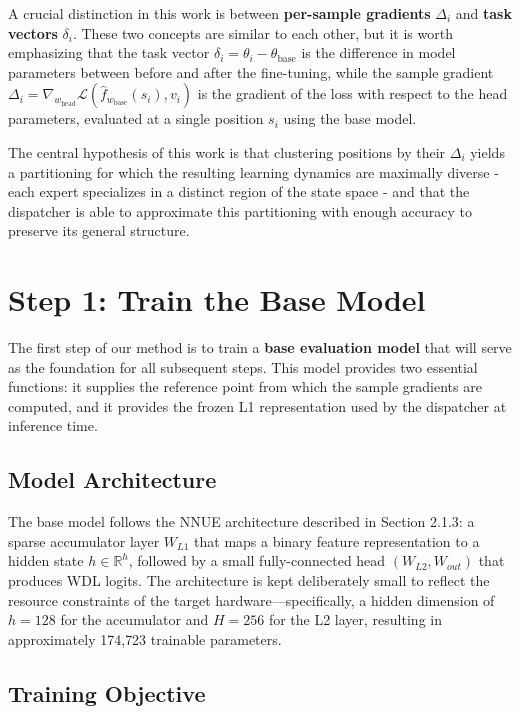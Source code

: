 A crucial distinction in this work is between \textbf{per-sample gradients} $\Delta_i$ and \textbf{task vectors} $\delta_i$. These two concepts are similar to each other, but it is worth emphasizing that the task vector $\delta_i = \theta_i - \theta_{\text{base}}$ is the difference in model parameters between before and after the fine-tuning, while the sample gradient $\Delta_i = \nabla_{w_{\text{head}}} \mathcal{L}(\hat{f}_{w_{\text{base}}}(s_i), v_i)$ is the gradient of the loss with respect to the head parameters, evaluated at a single position $s_i$ using the base model.

The central hypothesis of this work is that clustering positions by their $\Delta_i$ yields a partitioning for which the resulting learning dynamics are maximally diverse - each expert specializes in a distinct region of the state space - and that the dispatcher is able to approximate this partitioning with enough accuracy to preserve its general structure.


\section{Step 1: Train the Base Model}

The first step of our method is to train a \textbf{base evaluation model} that will serve as the foundation for all subsequent steps. This model provides two essential functions: it supplies the reference point from which the sample gradients are computed, and it provides the frozen L1 representation used by the dispatcher at inference time.

\subsection{Model Architecture}

The base model follows the NNUE architecture described in Section 2.1.3: a sparse accumulator layer $W_{L1}$ that maps a binary feature representation to a hidden state $h \in \mathbb{R}^h$, followed by a small fully-connected head $(W_{L2}, W_{out})$ that produces WDL logits. The architecture is kept deliberately small to reflect the resource constraints of the target hardware---specifically, a hidden dimension of $h = 128$ for the accumulator and $H = 256$ for the L2 layer, resulting in approximately 174{,}723 trainable parameters.

\subsection{Training Objective}

